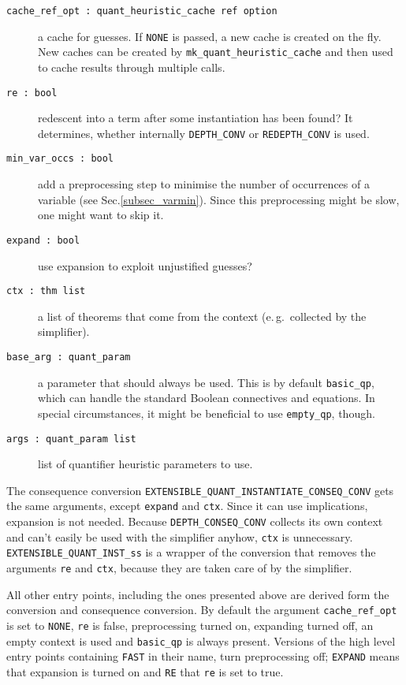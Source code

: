 \documentclass[a4paper,12pt,DIV=12,oneside]{scrbook}
\theoremstyle{definition}
\theoremstyle{remark}
\begin{document}
\begin{description}
  \item[\texttt{cache\_ref\_opt\ :\ quant\_heuristic\_cache ref option}]
     a cache for guesses. If \texttt{NONE} is passed,
     a new cache is created on the fly. New caches can be created by \texttt{mk\_quant\_heuristic\_cache} and then
     used to cache results through multiple calls.
  \item[\texttt{re\ :\ bool}]  redescent into a term after some instantiation has been found?
     It determines, whether internally \texttt{DEPTH\_CONV} or \texttt{REDEPTH\_CONV} is used.

  \item[\texttt{min\_var\_occs\ :\ bool}]  add a preprocessing step to minimise the number of occurrences of
    a variable (see Sec.\ref{subsec_varmin}). Since this preprocessing might be slow, one might want to skip it.

  \item[\texttt{expand\ :\ bool}]  use expansion to exploit unjustified guesses?

  \item[\texttt{ctx\ :\ thm list}]  a list of theorems that come from the context (e.\,g.\ collected by the simplifier).

  \item[\texttt{base\_arg\ :\ quant\_param}]  a parameter that should always be used. This is by default
   \texttt{basic\_qp}, which can handle the standard Boolean connectives and equations. In special circumstances,
     it might be beneficial to use \texttt{empty\_qp}, though.

  \item[\texttt{args\ :\ quant\_param list}]  list of quantifier heuristic parameters to use.
\end{description}

The consequence conversion
\texttt{EXTENSIBLE\_QUANT\_INSTANTIATE\_CONSEQ\_CONV} gets the same
arguments, except \texttt{expand} and \texttt{ctx}. Since it can use
implications, expansion is not needed. Because
\texttt{DEPTH\_CONSEQ\_CONV} collects its own context and can't easily
be used with the simplifier anyhow, \texttt{ctx} is unnecessary.
\texttt{EXTENSIBLE\_QUANT\_INST\_ss} is a wrapper of the conversion that removes the arguments
\texttt{re} and \texttt{ctx}, because they are taken care of by the simplifier.

All other entry points, including the ones presented above are derived
form the conversion and consequence conversion. By default the argument
\texttt{cache\_ref\_opt} is set to \texttt{NONE}, \texttt{re} is false,
preprocessing turned on, expanding turned off, an empty context is used and
\texttt{basic\_qp} is always present. Versions of the high level entry points
containing \texttt{FAST} in their name, turn preprocessing off; \texttt{EXPAND} means that
expansion is turned on and \texttt{RE} that \texttt{re} is set to true.
\end{document}
